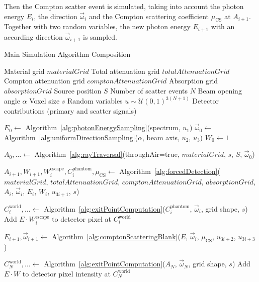Then the Compton scatter event is simulated, taking into account the photon
energy $E_i$, the direction $\vec{\omega}_i$ and the Compton scattering
coefficient $\mu_{\text{CS}}$ at $A_{i+1}$. Together with two random variables,
the new photon energy $E_{i+1}$ with an according direction $\vec{\omega}_{i+1}$
is sampled.

\begin{algorithm}[H]
\caption{Main Simulation Algorithm Composition}
\label{alg:mainSimulation}
\begin{algorithmic}[1]
\Require Material grid $materialGrid$
\Require Total attenuation grid $totalAttenuationGrid$
\Require Compton attenuation grid $comptonAttenuationGrid$
\Require Absorption grid $absorptionGrid$
\Require Source position $S$
\Require Number of scatter events $N$
\Require Beam opening angle $\alpha$
\Require Voxel size $s$
\Require Random variables $u \sim \mathcal{U}(0, 1)^{3(N+1)}$
\Ensure Detector contributions (primary and scatter signals)

\State $E_0 \gets$ Algorithm~\ref{alg:photonEnergySampling}(spectrum, $u_1$)
\State $\vec{\omega}_0 \gets$ Algorithm~\ref{alg:uniformDirectionSampling}($\alpha$, beam axis, $u_2$, $u_3$)
\State $W_0 \gets 1$

\State $A_0, \ldots \gets$ Algorithm~\ref{alg:rayTraversal}(throughAir=true, $materialGrid$, $s$, $S$, $\vec{\omega}_0$)

    \State $A_{i+1}, W_{i+1}, W^\text{escape}_{i}, C^\text{phantom}_{i}, \mu_\text{CS} \gets$ Algorithm~\ref{alg:forcedDetection}($materialGrid$, $totalAttenuationGrid$, $comptonAttenuationGrid$, $absorptionGrid$, $A_i$, $\vec{\omega}_i$, $E_i$, $W_i$, $u_{3i+1}$, $s$)
    
        \State $C^\text{world}_i, \ldots \gets$ Algorithm~\ref{alg:exitPointComputation}($C^\text{phantom}_i$, $\vec{\omega}_i$, grid shape, $s$)
        \State Add $E \cdot W^\text{escape}_i$ to detector pixel at $C^\text{world}_i$
    \EndIf

    \State $E_{i+1}, \vec{\omega}_{i+1} \gets$ Algorithm~\ref{alg:comptonScatteringBlank}($E$, $\vec{\omega}_i$, $\mu_\text{CS}$, $u_{3i+2}$, $u_{3i+3}$)
\EndFor

\State $C^\text{world}_N, \ldots \gets$ Algorithm~\ref{alg:exitPointComputation}($A_N$, $\vec{\omega}_N$, grid shape, $s$)
\State Add $E \cdot W$ to detector pixel intensity at $C^\text{world}_N$

\end{algorithmic}
\end{algorithm}
